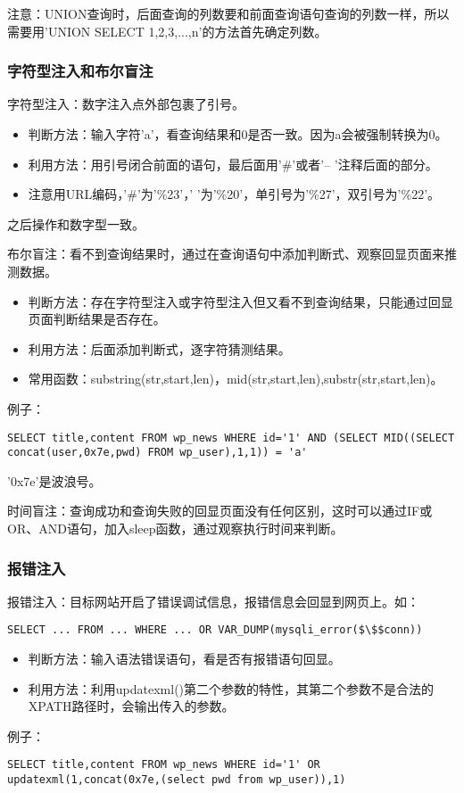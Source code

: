注意：UNION查询时，后面查询的列数要和前面查询语句查询的列数一样，所以需要用'UNION SELECT 1,2,3,...,n'的方法首先确定列数。

\subsubsection*{字符型注入和布尔盲注}
字符型注入：数字注入点外部包裹了引号。
\begin{itemize}
    \item 判断方法：输入字符'a'，看查询结果和0是否一致。因为a会被强制转换为0。
    \item 利用方法：用引号闭合前面的语句，最后面用'\#'或者'-- '注释后面的部分。
    \item 注意用URL编码，'\#'为'\%23'，' '为'\%20'，单引号为'\%27'，双引号为'\%22'。
\end{itemize}
之后操作和数字型一致。

布尔盲注：看不到查询结果时，通过在查询语句中添加判断式、观察回显页面来推测数据。
\begin{itemize}
    \item 判断方法：存在字符型注入或字符型注入但又看不到查询结果，只能通过回显页面判断结果是否存在。
    \item 利用方法：后面添加判断式，逐字符猜测结果。
    \item 常用函数：substring(str,start,len)，mid(str,start,len),substr(str,start,len)。
\end{itemize}
例子：
\begin{lstlisting}
SELECT title,content FROM wp_news WHERE id='1' AND (SELECT MID((SELECT concat(user,0x7e,pwd) FROM wp_user),1,1)) = 'a'
\end{lstlisting}
'0x7e'是波浪号。

时间盲注：查询成功和查询失败的回显页面没有任何区别，这时可以通过IF或OR、AND语句，加入sleep函数，通过观察执行时间来判断。

\subsubsection*{报错注入}
报错注入：目标网站开启了错误调试信息，报错信息会回显到网页上。如：
\begin{lstlisting}
SELECT ... FROM ... WHERE ... OR VAR_DUMP(mysqli_error($\$$conn))
\end{lstlisting}
\begin{itemize}
    \item 判断方法：输入语法错误语句，看是否有报错语句回显。
    \item 利用方法：利用updatexml()第二个参数的特性，其第二个参数不是合法的XPATH路径时，会输出传入的参数。
\end{itemize}
例子：
\begin{lstlisting}
SELECT title,content FROM wp_news WHERE id='1' OR updatexml(1,concat(0x7e,(select pwd from wp_user)),1)
\end{lstlisting}

